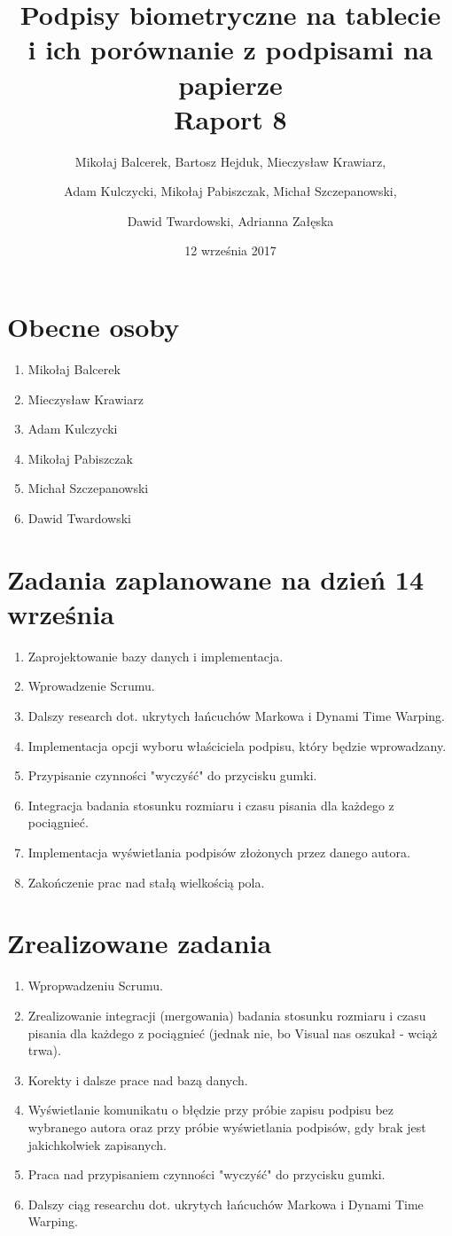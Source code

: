 \documentclass{mwrep}
\title{Podpisy biometryczne na tablecie \\ i ich porównanie z podpisami na papierze\\ 
Raport 8}
\author{Mikołaj Balcerek, Bartosz Hejduk, Mieczysław Krawiarz, \and Adam Kulczycki, Mikołaj Pabiszczak, Michał Szczepanowski, \and Dawid Twardowski, Adrianna Załęska}
\date{12 września 2017}
\begin{document}
\maketitle
{\let\clearpage\relax 
\chapter{Obecne osoby}}
\begin{enumerate}
    \item Mikołaj Balcerek
    \item Mieczysław Krawiarz
    \item Adam Kulczycki
    \item Mikołaj Pabiszczak
    \item Michał Szczepanowski
    \item Dawid Twardowski
\end{enumerate}


{\let\clearpage\relax 
\chapter{Zadania zaplanowane na dzień 14 września}}
\begin{enumerate}
	\item Zaprojektowanie bazy danych i implementacja.
	\item Wprowadzenie Scrumu.
	\item Dalszy research dot. ukrytych łańcuchów Markowa i Dynami Time Warping.
	\item Implementacja opcji wyboru właściciela podpisu, który będzie wprowadzany.
	\item Przypisanie czynności "wyczyść" do przycisku gumki.
	\item Integracja badania stosunku rozmiaru i czasu pisania dla każdego z pociągnieć.
	\item Implementacja wyświetlania podpisów złożonych przez danego autora.
	\item Zakończenie prac nad stałą wielkością pola.
\end{enumerate}


{\let\clearpage\relax 
\chapter{Zrealizowane zadania}}
\begin{enumerate}
	\item Wpropwadzeniu Scrumu.
	\item Zrealizowanie integracji (mergowania) badania stosunku rozmiaru i czasu pisania dla każdego z pociągnieć (jednak nie, bo Visual nas oszukał - wciąż trwa).
	\item Korekty i dalsze prace nad bazą danych.
	\item Wyświetlanie komunikatu o błędzie przy próbie zapisu podpisu bez wybranego autora oraz przy próbie wyświetlania podpisów, gdy brak jest jakichkolwiek zapisanych.
	\item Praca nad przypisaniem czynności "wyczyść" do przycisku gumki.
	\item Dalszy ciąg researchu dot. ukrytych łańcuchów Markowa i Dynami Time Warping.
	 
	\end{enumerate}
\end{document}
